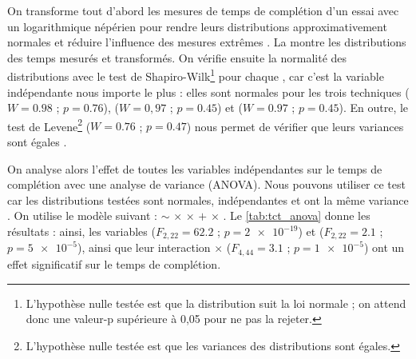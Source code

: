 On transforme tout d'abord les mesures de temps de complétion d'un essai avec un logarithmique népérien pour rendre leurs distributions approximativement normales et réduire l'influence des mesures extrêmes \citep[p. 25]{Dragicevic2016}. La  montre les distributions des temps mesurés et transformés. On vérifie ensuite la normalité des distributions avec le test de Shapiro-Wilk\footnote{L'hypothèse nulle testée est que la distribution suit la loi normale ; on attend donc une valeur-p supérieure à 0,05 pour ne pas la rejeter.} \citep{Wobbrock2016} pour chaque , car c'est la variable indépendante nous importe le plus : elles sont normales pour les trois techniques  ($W = \num{0.98}$ ; $p = \num{0.76}$),  ($W = 0,97$ ; $p = \num{0.45}$) et  ($W = \num{0.97}$ ; $p = \num{0.45}$). En outre, le test de Levene\footnote{L'hypothèse nulle testée est que les variances des distributions sont égales.} ($W = \num{0.76}$ ; $p = \num{0.47}$) nous permet de vérifier que leurs variances sont égales \citep{Wobbrock2016}.

On analyse alors l'effet de toutes les variables indépendantes sur le temps de complétion avec une analyse de variance (ANOVA). Nous pouvons utiliser ce test car les distributions testées sont normales, indépendantes et ont la même variance \citep{Wobbrock2016}. On utilise le modèle suivant :  $\sim$  $\times$  $\times$  $+$  $\times$ . Le \autoref{tab:tct_anova} donne les résultats : ainsi, les variables  ($F_{2,22} = \num{62.2}$ ; $p = \num{2e-19}$) et  ($F_{2,22} = \num{2.1}$ ; $p = \num{5e-5}$), ainsi que leur interaction  $\times$  ($F_{4,44} = \num{3.1}$ ; $p = \num{1e-5}$) ont un effet significatif sur le temps de complétion.

